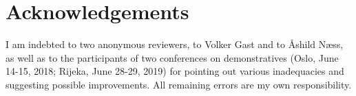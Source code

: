 \documentclass[output=paper,colorlinks,citecolor=brown]{langscibook}
\begin{document}
\section*{Acknowledgements}

I am indebted to two anonymous reviewers, to Volker Gast and to Åshild Næss, as well as to the participants of two conferences on demonstratives (Oslo, June 14-15, 2018; Rijeka, June 28-29, 2019) for pointing out various inadequacies and suggesting possible improvements. All remaining errors are my own responsibility.

\sloppy\printbibliography[heading=subbibliography,notkeyword=this]
\end{document}
